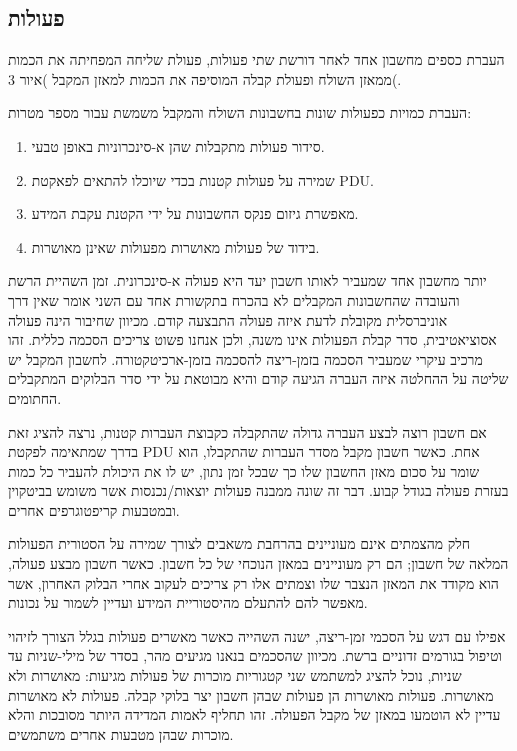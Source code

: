 \subsection{פעולות} \label{sec:transactions}
העברת כספים מחשבון אחד לאחר דורשת שתי פעולות, פעולת שליחה המפחיתה את הכמות ממאזן השולח ופעולת קבלה המוסיפה את הכמות למאזן המקבל )איור 3(.

העברת כמויות כפעולות שונות בחשבונות השולח והמקבל משמשת עבור מספר מטרות:
\begin{enumerate}
   \item סידור פעולות מתקבלות שהן א-סינכרוניות באופן טבעי.
   \item שמירה על פעולות קטנות בכדי שיוכלו להתאים לפאקטת PDU.
   \item מאפשרת גיזום פנקס החשבונות על ידי הקטנת עקבת המידע.
   \item בידוד של פעולות מאושרות מפעולות שאינן מאושרות.
\end{enumerate}

יותר מחשבון אחד שמעביר לאותו חשבון יעד היא פעולה א-סינכרונית. זמן השהיית הרשת והעובדה שהחשבונות המקבלים לא בהכרח בתקשורת אחד עם השני אומר שאין דרך אוניברסלית מקובלת לדעת איזה פעולה התבצעה קודם. מכיוון שחיבור הינה פעולה אסוציאטיבית, סדר קבלת הפעולות אינו משנה, ולכן אנחנו פשוט צריכים הסכמה כללית. זהו מרכיב עיקרי שמעביר הסכמה בזמן-ריצה להסכמה בזמן-ארכיטקטורה. לחשבון המקבל יש שליטה על ההחלטה איזה העברה הגיעה קודם והיא מבוטאת על ידי סדר הבלוקים המתקבלים החתומים. 

אם חשבון רוצה לבצע העברה גדולה שהתקבלה כקבוצת העברות קטנות, נרצה להציג זאת בדרך שמתאימה לפקטת PDU אחת. כאשר חשבון מקבל מסדר העברות שהתקבלו, הוא שומר על סכום מאזן החשבון שלו כך שבכל זמן נתון, יש לו את היכולת להעביר כל כמות בעזרת פעולה בגודל קבוע. דבר זה שונה ממבנה פעולות יוצאות/נכנסות אשר משומש בביטקוין ובמטבעות קריפטוגרפים אחרים. 

חלק מהצמתים אינם מעוניינים בהרחבת משאבים לצורך שמירה על הסטורית הפעולות המלאה של חשבון; הם רק מעוניינים במאזן הנוכחי של כל חשבון. כאשר חשבון מבצע פעולה, הוא מקודד את המאזן הנצבר שלו וצמתים אלו רק צריכים לעקוב אחרי הבלוק האחרון, אשר מאפשר להם להתעלם מהיסטוריית המידע ועדיין לשמור על נכונות.

אפילו עם דגש על הסכמי זמן-ריצה, ישנה השהייה כאשר מאשרים פעולות בגלל הצורך לזיהוי וטיפול בגורמים זדוניים ברשת. מכיוון שהסכמים בנאנו מגיעים מהר, בסדר של מילי-שניות עד שניות, נוכל להציג למשתמש שני קטגוריות מוכרות של פעולות מגיעות: מאושרות ולא מאושרות. פעולות מאושרות הן פעולות שבהן חשבון יצר בלוקי קבלה. פעולות לא מאושרות עדיין לא הוטמעו במאזן של מקבל הפעולה. זהו תחליף לאמות המדידה היותר מסובכות והלא מוכרות שבהן מטבעות אחרים משתמשים.

